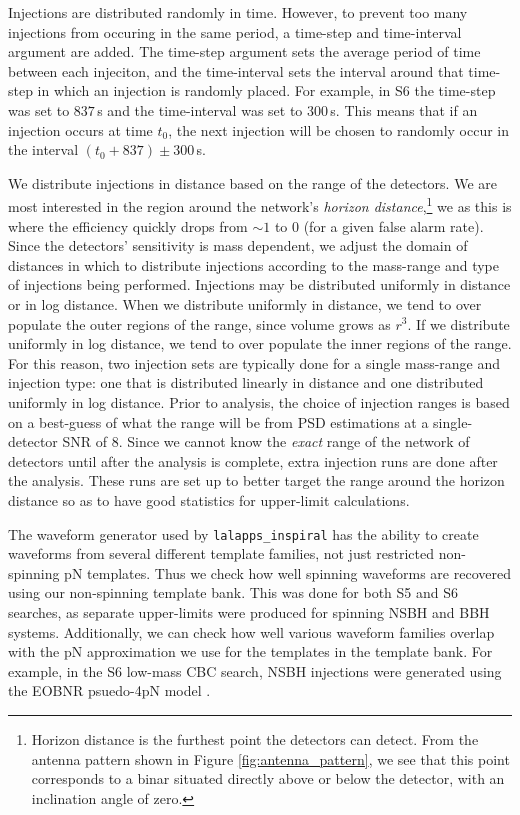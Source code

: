 Injections are distributed randomly in time. However, to prevent too many
injections from occuring in the same period, a time-step and time-interval
argument are added. The time-step argument sets the average period of time
between each injeciton, and the time-interval sets the interval around that
time-step in which an injection is randomly placed. For example, in \ac{S6} the
time-step was set to $837\,$s and the time-interval was set to $300\,$s. This
means that if an injection occurs at time $t_0$, the next injection will be
chosen to randomly occur in the interval $(t_0 + 837) \pm 300\,$s.

We distribute injections in distance based on the range of the detectors. We
are most interested in the region around the network's \emph{horizon
distance},\footnote{Horizon distance is the furthest point the detectors can
detect. From the antenna pattern shown in Figure \ref{fig:antenna_pattern}, we
see that this point corresponds to a binar situated directly above or below the
detector, with an inclination angle of zero.} we as this is where the
efficiency quickly drops from $\sim1$ to $0$ (for a given false alarm rate).
Since the detectors' sensitivity is mass dependent, we adjust the domain of
distances in which to distribute injections according to the mass-range and
type of injections being performed. Injections may be distributed uniformly in
distance or in log distance. When we distribute uniformly in distance, we tend
to over populate the outer regions of the range, since volume grows as $r^3$.
If we distribute uniformly in log distance, we tend to over populate the inner
regions of the range. For this reason, two injection sets are typically done
for a single mass-range and injection type: one that is distributed linearly in
distance and one distributed uniformly in log distance. Prior to analysis, the
choice of injection ranges is based on a best-guess of what the range will be
from \ac{PSD} estimations at a single-detector \ac{SNR} of 8. Since we cannot
know the \emph{exact} range of the network of detectors until after the
analysis is complete, extra injection runs are done after the analysis. These
runs are set up to better target the range around the horizon distance so as to
have good statistics for upper-limit calculations.

The waveform generator used by \texttt{lalapps\_inspiral} has the ability to
create waveforms from several different template families, not just restricted
non-spinning \ac{pN} templates. Thus we check how well spinning waveforms are
recovered using our non-spinning template bank. This was done for both \ac{S5}
and \ac{S6} searches, as separate upper-limits were produced for spinning
\ac{NSBH} and \ac{BBH} systems. Additionally, we can check how well various
waveform families overlap with the \ac{pN} approximation we use for the
templates in the template bank. For example, in the \ac{S6} low-mass \ac{CBC}
search, \ac{NSBH} injections were generated using the EOBNR psuedo-4\ac{pN}
model \cite{Buonanno:2009qa}.

